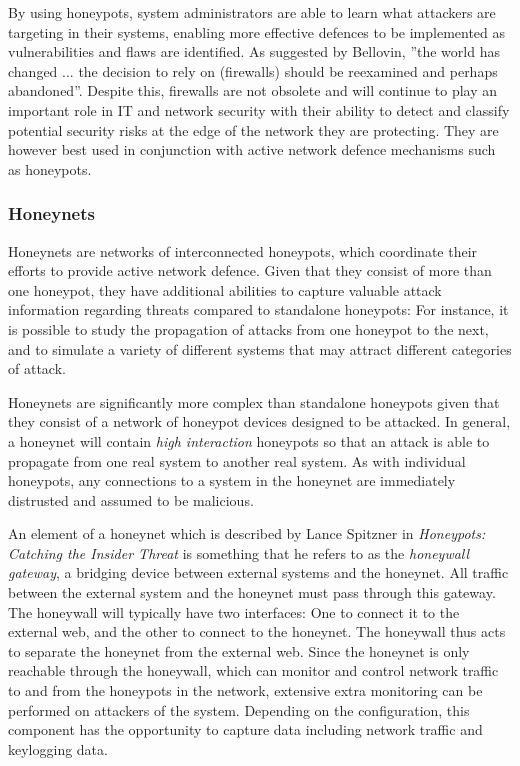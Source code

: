 By using honeypots, system administrators are able to learn what attackers are targeting in their systems, enabling more effective defences to be implemented as vulnerabilities and flaws are identified. As suggested by Bellovin, ''the world has changed ... the decision to rely on (firewalls) should be reexamined and perhaps abandoned''. Despite this, firewalls are not obsolete and will continue to play an important role in IT and network security with their ability to detect and classify potential security risks at the edge of the network they are protecting. They are however best used in conjunction with active network defence mechanisms such as honeypots. \cite{ThinkingSecurityBellovin}


\subsubsection{Honeynets} \label{HoneynetsExplanationSoA}
Honeynets are networks of interconnected honeypots, which coordinate their efforts to provide active network defence. Given that they consist of more than one honeypot, they have additional abilities to capture valuable attack information regarding threats compared to standalone honeypots: For instance, it is possible to study the propagation of attacks from one honeypot to the next, and to simulate a variety of different systems that may attract different categories of attack.

Honeynets are significantly more complex than standalone honeypots given that they consist of a network of honeypot devices designed to be attacked. In general, a honeynet will contain \textit{high interaction} honeypots so that an attack is able to propagate from one real system to another real system. As with individual honeypots, any connections to a system in the honeynet are immediately distrusted and assumed to be malicious. 

An element of a honeynet which is described by Lance Spitzner in \textit{Honeypots: Catching the Insider Threat} \cite{Spitzner:2003:HCI:956415.956438} is something that he refers to as the \textit{honeywall gateway}, a bridging device between external systems and the honeynet. All traffic between the external system and the honeynet must pass through this gateway. The honeywall will typically have two interfaces: One to connect it to the external web, and the other to connect to the honeynet. The honeywall thus acts to separate the honeynet from the external web. Since the honeynet is only reachable through the honeywall, which can monitor and control network traffic to and from the honeypots in the network, extensive extra monitoring can be performed on attackers of the system. Depending on the configuration, this component has the opportunity to capture data including network traffic and keylogging data.

